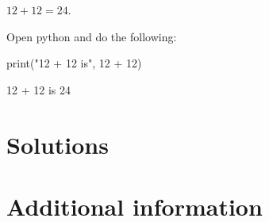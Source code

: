 \documentclass{book}
\begin{document}
\begin{solution}
  \(12 + 12 = 24\).
\end{solution}

\begin{additionalinformation}
Open python and do the following:

\begin{pycell}
print("12 + 12 is", 12 + 12)
\end{pycell}
\begin{pyexpectedoutput}
12 + 12 is 24
\end{pyexpectedoutput}
\end{additionalinformation}

\chapter{Solutions}

\chapter{Additional information}

\SaveReplacements
\end{document}
